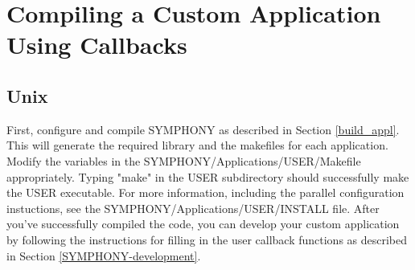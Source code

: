 




\section{Compiling a Custom Application Using Callbacks}

\subsection{Unix}

First, configure and compile SYMPHONY \VER as described in
Section \ref{build_appl}. This will generate the required library
and the makefiles for each application. Modify the variables in the 
SYMPHONY/Applications/USER/Makefile appropriately. 
Typing "make" in the USER subdirectory should successfully make
the USER executable. For more information, including the parallel 
configuration instuctions, see the 
SYMPHONY/Applications/USER/INSTALL file. 
After you've successfully compiled the code, you can develop your custom 
application by following the
instructions for filling in the user callback functions as described in
Section \ref{SYMPHONY-development}.

